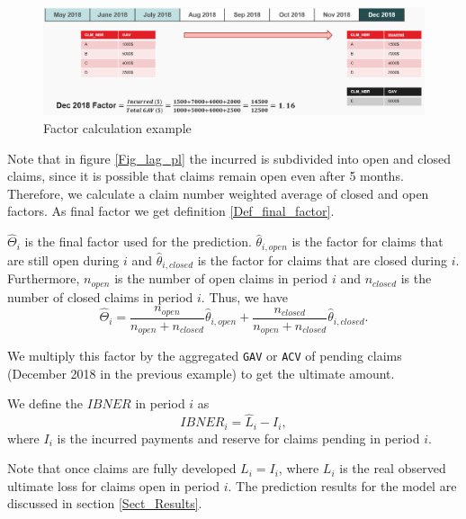 	\begin{figure}[H]
		\begin{center}
			\includegraphics[scale=0.4]{Graphiques/factor_example} 
			\renewcommand{\figurename}{Figure}
			\caption{Factor calculation example}\label{Fig_factor_example}
		\end{center}
	\end{figure}
	Note that in figure \ref{Fig_lag_pl} the incurred is subdivided into open and closed claims, since it is possible that claims remain open even after 5 months. Therefore, we calculate a claim number weighted average of closed and open factors. As final factor we get definition \ref{Def_final_factor}.
	\begin{Definition}\label{Def_final_factor}
		$\hat{\Theta}_i$ is the final factor used for the prediction. $\hat{\theta}_{i,open}$ is the factor for claims that are still open during $i$ and  $\hat{\theta}_{i,closed}$ is the factor for claims that are closed during $i$. Furthermore, $n_{open}$ is the number of open claims in period $i$ and $n_{closed}$ is the number of closed claims in period $i$. Thus, we have
		$$\hat{\Theta}_i = \frac{n_{open}}{n_{open} + n_{closed}} \hat{\theta}_{i,open} + \frac{n_{closed}}{n_{open} + n_{closed}}  \hat{\theta}_{i,closed}.$$ 
	\end{Definition}
	
	We multiply this factor by the aggregated \texttt{GAV} or \texttt{ACV} of pending claims (December 2018 in the previous example) to get the ultimate amount.
	
	\begin{Definition}\label{Def_IBNER}
		We define the $IBNER$ in period $i$ as
		$$IBNER_i = \hat{L}_i - I_i,$$
		where $I_i$ is the incurred payments and reserve for claims pending in period $i$.
	\end{Definition}
	Note that once claims are fully developed $L_i = I_i$, where $L_i$ is the real observed ultimate loss for claims open in period $i$. 
	The prediction results for the model are discussed in section \ref{Sect_Results}.
	
